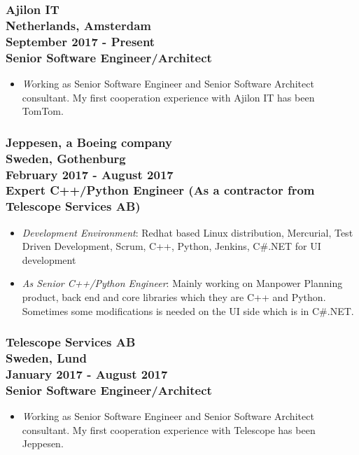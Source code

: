 \documentclass[10pt,a4paper]{article}
\begin{document}
\subsubsection{{\large Ajilon IT} \\ \textnormal{Netherlands, Amsterdam} \\ \textnormal{September 2017 - Present} \\ {Senior Software Engineer/Architect}}
  \setlength{\leftskip}{0.5cm}
  \setlength{\rightskip}{1cm}
  \begin{itemize}
    \setlength{\rightskip}{1cm}
    \setlength\itemsep{0em}
    \item \small \textit Working as Senior Software Engineer and Senior Software Architect consultant. My first cooperation experience with Ajilon IT has been TomTom.
  \end{itemize}
  \setlength{\leftskip}{0pt}
  \setlength{\rightskip}{0cm}
  
\subsubsection{{\large Jeppesen, a Boeing company} \\ \textnormal{Sweden, Gothenburg} \\ \textnormal{February 2017 - August 2017} \\ {Expert C++/Python Engineer (As a contractor from Telescope Services AB)}}
  \setlength{\leftskip}{0.5cm}
  \setlength{\rightskip}{1cm}
  \begin{itemize}
    \setlength{\rightskip}{1cm}
    \setlength\itemsep{0em}
    \item \small \textit {Development Environment}: Redhat based Linux distribution, Mercurial, Test Driven Development, Scrum, C++, Python, Jenkins, C\#.NET for UI development
    \item \small \textit {As Senior C++/Python Engineer}: Mainly working on Manpower Planning product, back end and core libraries which they are C++ and Python. Sometimes some modifications is needed on the UI side which is in C\#.NET.
  \end{itemize}
  \setlength{\leftskip}{0pt}
  \setlength{\rightskip}{0cm}
  
\subsubsection{{\large Telescope Services AB} \\ \textnormal{Sweden, Lund} \\ \textnormal{January 2017 - August 2017} \\ {Senior Software Engineer/Architect}}
  \setlength{\leftskip}{0.5cm}
  \setlength{\rightskip}{1cm}
  \begin{itemize}
    \setlength{\rightskip}{1cm}
    \setlength\itemsep{0em}
    \item \small \textit Working as Senior Software Engineer and Senior Software Architect consultant. My first cooperation experience with Telescope has been Jeppesen.
  \end{itemize}
  \setlength{\leftskip}{0pt}
  \setlength{\rightskip}{0cm}
  
\end{document}

